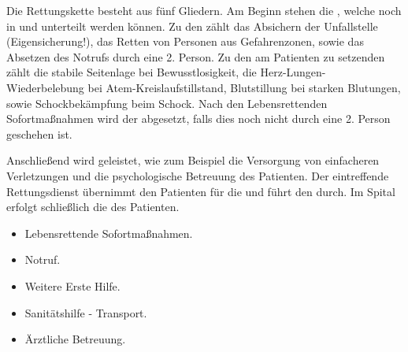 {
Die Rettungskette besteht aus fünf Gliedern. 
Am Beginn stehen die , welche noch in
 und  unterteilt werden können. Zu den  zählt 
das Absichern der Unfallstelle (Eigensicherung!), das
Retten von Personen aus Gefahrenzonen, sowie das Absetzen des Notrufs durch
eine 2. Person. Zu den am Patienten zu setzenden
 zählt die stabile Seitenlage bei Bewusstlosigkeit, die
Herz-Lungen-Wiederbelebung bei Atem-Kreislaufstillstand, Blutstillung bei
starken Blutungen, sowie Schockbekämpfung beim Schock. Nach den Lebensrettenden
Sofortmaßnahmen wird der  abgesetzt, falls dies
noch nicht durch eine 2. Person geschehen ist.

Anschließend wird 
 geleistet, wie zum Beispiel die
Versorgung von einfacheren Verletzungen und die psychologische Betreuung des
Patienten. Der eintreffende Rettungsdienst übernimmt den Patienten für die  und führt den
 durch. Im Spital erfolgt schließlich die
 des Patienten. 

}{
\begin{itemize}
  \item Lebensrettende Sofortmaßnahmen.
  \item Notruf.
  \item Weitere Erste Hilfe.
  \item Sanitätshilfe - Transport.
  \item Ärztliche Betreuung.
\end{itemize}
}
{}{}{}





